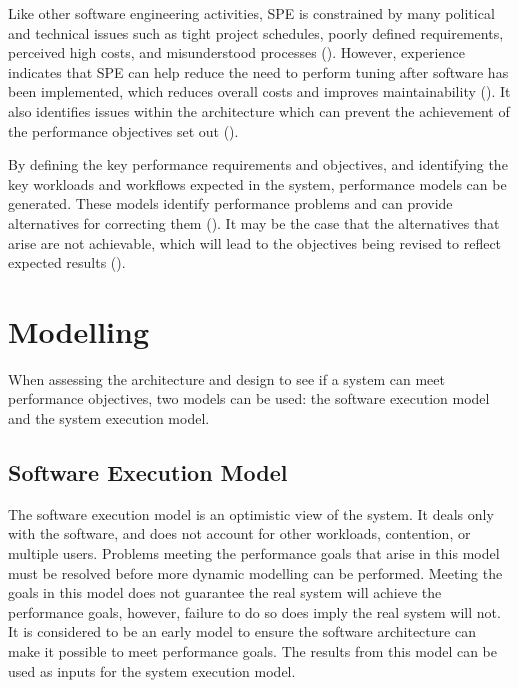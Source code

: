 \documentclass[a4paper,11pt,article,oneside]{memoir}
\begin{document}
	Like other software engineering activities, SPE is constrained by many political and technical issues such as tight project schedules, poorly defined requirements, perceived high costs, and misunderstood processes (\cite{woodside2007future}). However, experience indicates that SPE can help reduce the need to perform tuning after software has been implemented, which reduces overall costs and improves maintainability (\cite{smith1993software}). It also identifies issues within the architecture which can prevent the achievement of the performance objectives set out (\cite{smith2003best}). 
	
	By defining the key performance requirements and objectives, and identifying the key workloads and workflows expected in the system, performance models can be generated. These models identify performance problems and can provide alternatives for correcting them (\cite{smith2003best}). It may be the case that the alternatives that arise are not achievable, which will lead to the objectives being revised to reflect expected results (\cite{smith1997performance}).
	
	\section{Modelling}
	When assessing the architecture and design to see if a system can meet performance objectives, two models can be used: the software execution model and the system execution model. 
	\subsection{Software Execution Model}
	The software execution model is an optimistic view of the system. It deals only with the software, and does not account for other workloads, contention, or multiple users. Problems meeting the performance goals that arise in this model must be resolved before more dynamic modelling can be performed. Meeting the goals in this model does not guarantee the real system will achieve the performance goals, however, failure to do so does imply the real system will not. It is considered to be an early model to ensure the software architecture can make it possible to meet performance goals. The results from this model can be used as inputs for the system execution model.
\end{document}
